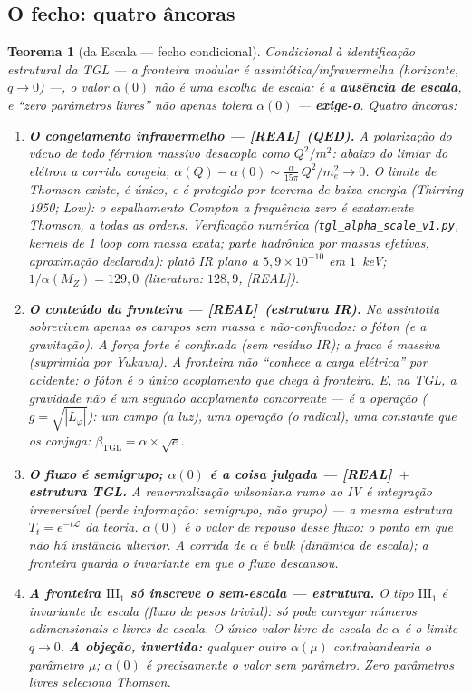 \documentclass[11pt,a4paper]{article}
\newcommand{\REAL}{\textsf{[REAL]}}
\newcommand{\bTGL}{\beta_{\mathrm{TGL}}}
\newtheorem{theorem}{Teorema}
\begin{document}
\subsection{O fecho: quatro âncoras}
\begin{theorem}[da Escala --- fecho condicional]\label{thm:escala}
Condicional à identificação estrutural da TGL ---
\emph{a fronteira modular é assintótica/infravermelha} (horizonte,
$q\to0$) ---, o valor $\alpha(0)$ não é uma escolha de escala: é a
\textbf{ausência de escala}, e ``zero parâmetros livres'' não apenas
tolera $\alpha(0)$ --- \textbf{exige-o}. Quatro âncoras:
\begin{enumerate}[noitemsep]
\item \textbf{O congelamento infravermelho --- \REAL\ (QED).} A
polarização do vácuo de todo férmion massivo desacopla como $Q^2/m^2$:
abaixo do limiar do elétron a corrida \emph{congela},
$\alpha(Q)-\alpha(0)\sim\tfrac{\alpha}{15\pi}\,Q^2/m_e^2\to0$. O limite
de Thomson existe, é único, e é \emph{protegido por teorema de baixa
energia} (Thirring 1950; Low): o espalhamento Compton a frequência zero é
\emph{exatamente} Thomson, a todas as ordens. Verificação numérica
(\texttt{tgl\_alpha\_scale\_v1.py}, kernels de 1 loop com massa exata;
parte hadrônica por massas efetivas, aproximação declarada):
platô IR plano a $5{,}9\times10^{-10}$ em $1$~keV;
$1/\alpha(M_Z)=129{,}0$ (literatura: $128{,}9$, \REAL).
\item \textbf{O conteúdo da fronteira --- \REAL\ (estrutura IR).} Na
assintotia sobrevivem apenas os campos sem massa e não-confinados: o
fóton (e a gravitação). A força forte é confinada (sem resíduo IR); a
fraca é massiva (suprimida por Yukawa). A fronteira não ``conhece a carga
elétrica'' por acidente: \emph{o fóton é o único acoplamento que chega à
fronteira}. E, na TGL, a gravidade não é um segundo acoplamento
concorrente --- é a \emph{operação} ($g=\sqrt{|L_\varphi|}$): um campo (a
luz), uma operação (o radical), uma constante que os conjuga:
$\bTGL=\alpha\times\sqrt e$.
\item \textbf{O fluxo é semigrupo; $\alpha(0)$ é a coisa julgada ---
\REAL\ $+$ estrutura TGL.} A renormalização wilsoniana rumo ao IV é
integração irreversível (perde informação: semigrupo, não grupo) --- a
\emph{mesma} estrutura $T_t=e^{-t\mathcal L}$ da teoria. $\alpha(0)$ é o
valor de repouso desse fluxo: o ponto em que não há instância ulterior. A
corrida de $\alpha$ é \emph{bulk} (dinâmica de escala); a fronteira guarda
o invariante em que o fluxo descansou.
\item \textbf{A fronteira $\mathrm{III}_1$ só inscreve o sem-escala ---
estrutura.} O tipo $\mathrm{III}_1$ é invariante de escala (fluxo de pesos
trivial): só pode carregar números adimensionais e \emph{livres de
escala}. O único valor livre de escala de $\alpha$ é o limite $q\to0$.
\textbf{A objeção, invertida:} qualquer outro $\alpha(\mu)$
contrabandearia o parâmetro $\mu$; $\alpha(0)$ é precisamente o valor
\emph{sem} parâmetro. Zero parâmetros livres \emph{seleciona} Thomson.
\end{enumerate}
\end{theorem}
\end{document}
